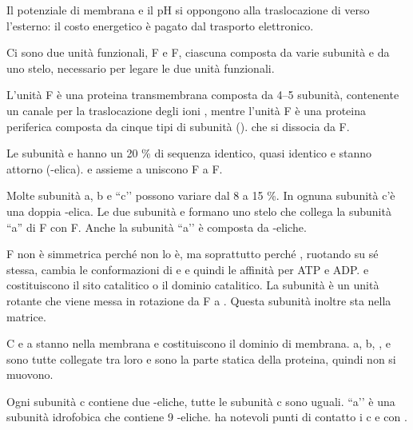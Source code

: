 Il potenziale di membrana e il pH si oppongono alla traslocazione di  verso l'esterno: il costo energetico è pagato dal trasporto elettronico.


Ci sono due unità funzionali, F e F, ciascuna composta da varie subunità e da uno stelo, necessario per legare le due unità funzionali.




L'unità F è una proteina transmembrana composta da 4--5 subunità, contenente un canale per la traslocazione degli ioni , mentre l'unità F è una proteina periferica composta da cinque tipi di subunità (\alpha{}\beta{}\gamma\delta\epsilon). che si dissocia da F.

Le subunità \alpha{} e \beta{} hanno un 20 \% di sequenza identico, quasi identico e stanno attorno \gamma{} (\alpha-elica). \epsilon{} e \delta{} assieme a \gamma{} uniscono F a F.

Molte subunità a, b e ``c’’ possono variare dal 8 a 15 \%. In ognuna subunità c'è una doppia \alpha-elica. Le due subunità \beta{} e \gamma{} formano uno stelo che collega la subunità ``a'' di F con F. Anche la subunità ``a’’ è composta da \alpha-eliche.

F non è simmetrica perché \gamma{} non lo è, ma soprattutto perché \gamma{}, ruotando su sé stessa, cambia le conformazioni di \alpha{} e \beta{} e quindi le affinità per ATP e ADP.{}
\alpha{}\beta{} e \gamma{} costituiscono il sito catalitico o il dominio catalitico. La subunità \gamma{} è un unità rotante che viene messa in rotazione da F a \epsilon. Questa subunità inoltre sta nella matrice.

C e a stanno nella membrana e costituiscono il dominio di membrana.
a, b, \delta{}, e \alpha\beta\alpha\beta\alpha\beta{} sono tutte collegate tra loro e sono la parte statica della proteina, quindi non si muovono.

Ogni subunità c contiene due \alpha-eliche, tutte le subunità c sono uguali.
``a’’ è una subunità idrofobica che contiene 9 \alpha-eliche.
\epsilon{} ha notevoli punti di contatto i c e con \gamma{}.{}


